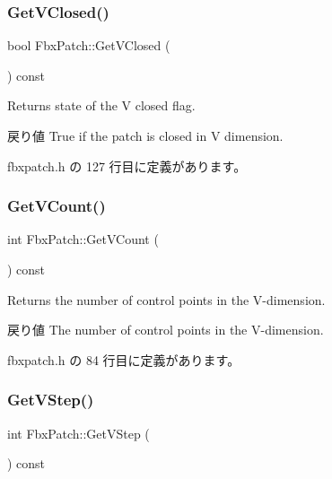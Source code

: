 \subsubsection{\texorpdfstring{Get\+V\+Closed()}{GetVClosed()}}
{\footnotesize\ttfamily bool Fbx\+Patch\+::\+Get\+V\+Closed (\begin{DoxyParamCaption}{ }\end{DoxyParamCaption}) const\hspace{0.3cm}{\ttfamily [inline]}}

Returns state of the V closed flag. \begin{DoxyReturn}{戻り値}
{\ttfamily True} if the patch is closed in V dimension. 
\end{DoxyReturn}


 fbxpatch.\+h の 127 行目に定義があります。

\mbox{\label{class_fbx_patch_ad2c56fe0035f645367c4184c8c051044}} 
\subsubsection{\texorpdfstring{Get\+V\+Count()}{GetVCount()}}
{\footnotesize\ttfamily int Fbx\+Patch\+::\+Get\+V\+Count (\begin{DoxyParamCaption}{ }\end{DoxyParamCaption}) const\hspace{0.3cm}{\ttfamily [inline]}}

Returns the number of control points in the V-\/dimension. \begin{DoxyReturn}{戻り値}
The number of control points in the V-\/dimension. 
\end{DoxyReturn}


 fbxpatch.\+h の 84 行目に定義があります。

\mbox{\label{class_fbx_patch_a71e7d7a25b3cfc9fad3ffd8835b6337e}} 
\subsubsection{\texorpdfstring{Get\+V\+Step()}{GetVStep()}}
{\footnotesize\ttfamily int Fbx\+Patch\+::\+Get\+V\+Step (\begin{DoxyParamCaption}{ }\end{DoxyParamCaption}) const\hspace{0.3cm}{\ttfamily [inline]}}

